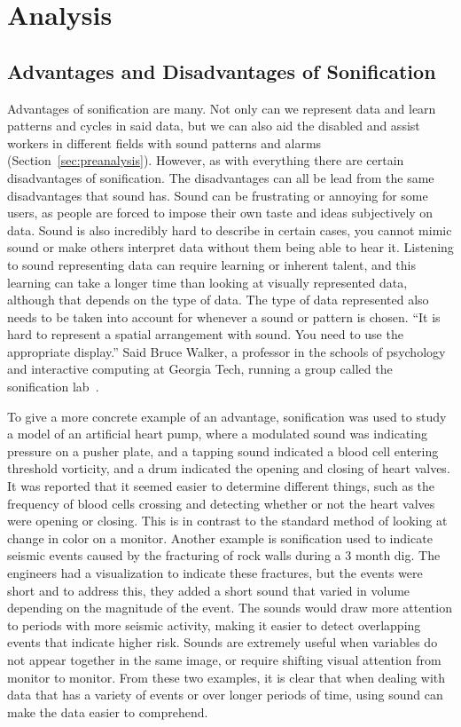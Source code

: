 
\section{Analysis} %
\label{sec:analysis}

\subsection{Advantages and Disadvantages of Sonification} %
\label{sub:advantages_and_disadvantages_of_sonification}

Advantages of sonification are many. 
Not only can we represent data and learn patterns and cycles in said data, but we can also aid the disabled and assist workers in different fields with sound patterns and alarms (Section~\ref{sec:preanalysis}).
However, as with everything there are certain disadvantages of sonification. 
The disadvantages can all be lead from the same disadvantages that sound has. 
Sound can be frustrating or annoying for some users, as people are forced to impose their own taste and ideas subjectively on data. 
Sound is also incredibly hard to describe in certain cases, you cannot mimic sound or make others interpret data without them being able to hear it. 
Listening to sound representing data can require learning or inherent talent, and this learning can take a longer time than looking at visually represented data, although that depends on the type of data. 
The type of data represented also needs to be taken into account for whenever a sound or pattern is chosen. 
\enquote{It is hard to represent a spatial arrangement with sound. You need to use the appropriate display.}
Said Bruce Walker, a professor in the schools of psychology and interactive computing at Georgia Tech, running a group called the sonification lab~\cite*{Feder2012}.

To give a more concrete example of an advantage, sonification was used to study a model of an artificial heart pump, where a modulated sound was indicating pressure on a pusher plate, and a tapping sound indicated a blood cell entering threshold vorticity, and a drum indicated the opening and closing of heart valves. 
It was reported that it seemed easier to determine different things, such as the frequency of blood cells crossing and detecting whether or not the heart valves were opening or closing. 
This is in contrast to the standard method of looking at change in color on a monitor. 
Another example is sonification used to indicate seismic events caused by the fracturing of rock walls during a 3 month dig.
The engineers had a visualization to indicate these fractures, but the events were short and to address this, they added a short sound that varied in volume depending on the magnitude of the event. 
The sounds would draw more attention to periods with more seismic activity, making it easier to detect overlapping events that indicate higher risk. 
Sounds are extremely useful when variables do not appear together in the same image, or require shifting visual attention from monitor to monitor. 
From these two examples, it is clear that when dealing with data that has a variety of events or over longer periods of time, using sound can make the data easier to comprehend.


